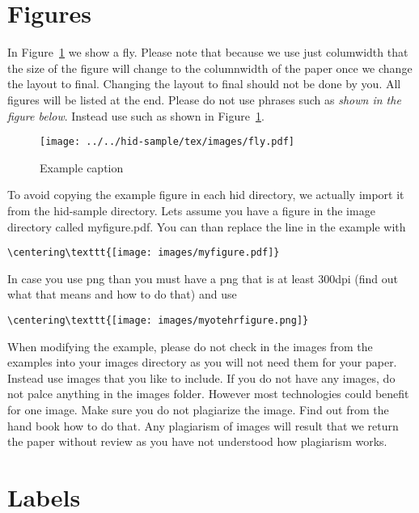 \section{Figures}

In Figure~\ref{f:fly} we show a fly. Please note that because we use
just columwidth that the size of the figure will change to the
columnwidth of the paper once we change the layout to final. Changing
the layout to final should not be done by you. All figures will be
listed at the end.  Please do not use phrases such as \textit{shown in
  the figure below}. Instead use such as shown in Figure~\ref{f:fly}.

\begin{figure}[!ht]
  \centering\texttt{[image: ../../hid-sample/tex/images/fly.pdf]}
  \caption{Example caption}\label{f:fly}
\end{figure}

To avoid copying the example figure in each hid directory, we actually
import it from the hid-sample directory. Lets assume you have a figure
in the image directory called myfigure.pdf. You can than replace the
line in the example with

\begin{verbatim}
\centering\texttt{[image: images/myfigure.pdf]}
\end{verbatim}

In case you use png than you must have a png that is at least 300dpi
(find out what that means and how to do that) and use 

\begin{verbatim}
\centering\texttt{[image: images/myotehrfigure.png]}
\end{verbatim}

When modifying the example, please do not check in the images from the
examples into your images directory as you will not need them for your
paper. Instead use images that you like to include. If you do not have
any images, do not palce anything in the images folder. However most
technologies could benefit for one image. Make sure you do not
plagiarize the image. Find out from the hand book how to do that. Any
plagiarism of images will result that we return the paper without
review as you have not understood how plagiarism works.


\section{Labels}

